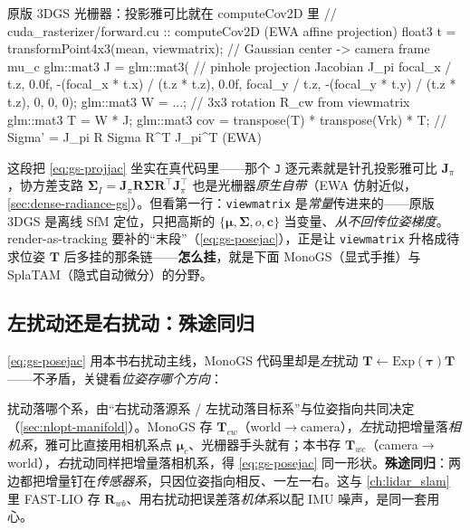 \begin{codebox}[C++]{原版 3DGS 光栅器：投影雅可比就在 computeCov2D 里}
// cuda_rasterizer/forward.cu :: computeCov2D  (EWA affine projection)
float3 t = transformPoint4x3(mean, viewmatrix);    // Gaussian center -> camera frame  mu_c
glm::mat3 J = glm::mat3(                            // pinhole projection Jacobian  J_pi
    focal_x / t.z, 0.0f, -(focal_x * t.x) / (t.z * t.z),
    0.0f, focal_y / t.z, -(focal_y * t.y) / (t.z * t.z),
    0, 0, 0);
glm::mat3 W = ...;                                  // 3x3 rotation R_cw from viewmatrix
glm::mat3 T = W * J;
glm::mat3 cov = transpose(T) * transpose(Vrk) * T; // Sigma' = J_pi R Sigma R^T J_pi^T  (EWA)
\end{codebox}

\noindent{}这段把 \cref{eq:gs-projjac} 坐实在真代码里——那个 \texttt{J} 逐元素就是针孔投影雅可比 $\mathbf J_\pi$，协方差支路 $\boldsymbol\Sigma_I=\mathbf J_\pi\mathbf R\boldsymbol\Sigma\mathbf R^\top\mathbf J_\pi^\top$ 也是光栅器\emph{原生自带}（EWA 仿射近似，\cref{sec:dense-radiance-gs}）。但看第一行：\texttt{viewmatrix} 是\emph{常量}传进来的——原版 3DGS 是离线 SfM 定位，只把高斯的 $\{\boldsymbol\mu,\boldsymbol\Sigma,o,\mathbf c\}$ 当变量、\emph{从不回传位姿梯度}。render-as-tracking 要补的“末段”（\cref{eq:gs-posejac}），正是让 \texttt{viewmatrix} 升格成待求位姿 $\mathbf T$ 后多挂的那条链——\textbf{怎么挂}，就是下面 MonoGS（显式手推）与 SplaTAM（隐式自动微分）的分野。

\subsection{左扰动还是右扰动：殊途同归}

\cref{eq:gs-posejac} 用本书右扰动主线，MonoGS 代码里却是\emph{左}扰动 $\mathbf T\leftarrow\mathrm{Exp}(\boldsymbol\tau)\mathbf T$——不矛盾，关键看\emph{位姿存哪个方向}：

\begin{note}
扰动落哪个系，由“右扰动落源系 / 左扰动落目标系”与位姿指向共同决定（\cref{sec:nlopt-manifold}）。MonoGS 存 $\mathbf T_{cw}$（world$\to$camera），\emph{左}扰动把增量落\emph{相机系}，雅可比直接用相机系点 $\boldsymbol\mu_c$、光栅器手头就有；本书存 $\mathbf T_{wc}$（camera$\to$world），\emph{右}扰动同样把增量落相机系，得 \cref{eq:gs-posejac} 同一形状。\textbf{殊途同归}：两边都把增量钉在\emph{传感器系}，只因位姿指向相反、一左一右。这与 \cref{ch:lidar_slam} 里 FAST-LIO 存 $\mathbf R_{wb}$、用右扰动把误差落\emph{机体系}以配 IMU 噪声，是同一套用心。
\end{note}

